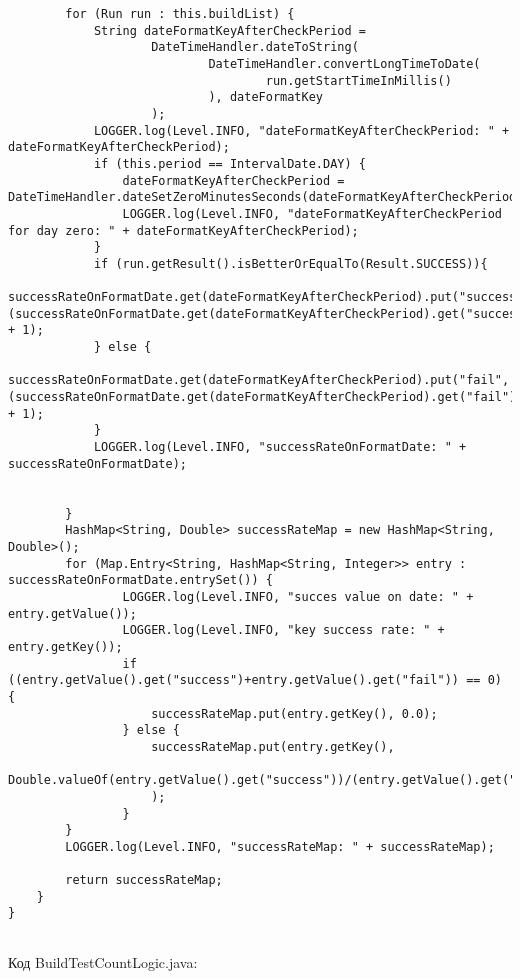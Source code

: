 \begin{lstlisting}
        for (Run run : this.buildList) {
            String dateFormatKeyAfterCheckPeriod =
                    DateTimeHandler.dateToString(
                            DateTimeHandler.convertLongTimeToDate(
                                    run.getStartTimeInMillis()
                            ), dateFormatKey
                    );
            LOGGER.log(Level.INFO, "dateFormatKeyAfterCheckPeriod: " + dateFormatKeyAfterCheckPeriod);
            if (this.period == IntervalDate.DAY) {
                dateFormatKeyAfterCheckPeriod = DateTimeHandler.dateSetZeroMinutesSeconds(dateFormatKeyAfterCheckPeriod);
                LOGGER.log(Level.INFO, "dateFormatKeyAfterCheckPeriod for day zero: " + dateFormatKeyAfterCheckPeriod);
            }
            if (run.getResult().isBetterOrEqualTo(Result.SUCCESS)){
                successRateOnFormatDate.get(dateFormatKeyAfterCheckPeriod).put("success", (successRateOnFormatDate.get(dateFormatKeyAfterCheckPeriod).get("success")) + 1);
            } else {
                successRateOnFormatDate.get(dateFormatKeyAfterCheckPeriod).put("fail", (successRateOnFormatDate.get(dateFormatKeyAfterCheckPeriod).get("fail")) + 1);
            }
            LOGGER.log(Level.INFO, "successRateOnFormatDate: " + successRateOnFormatDate);


        }
        HashMap<String, Double> successRateMap = new HashMap<String, Double>();
        for (Map.Entry<String, HashMap<String, Integer>> entry : successRateOnFormatDate.entrySet()) {
                LOGGER.log(Level.INFO, "succes value on date: " + entry.getValue());
                LOGGER.log(Level.INFO, "key success rate: " + entry.getKey());
                if ((entry.getValue().get("success")+entry.getValue().get("fail")) == 0) {
                    successRateMap.put(entry.getKey(), 0.0);
                } else {
                    successRateMap.put(entry.getKey(),
                            Double.valueOf(entry.getValue().get("success"))/(entry.getValue().get("success")+entry.getValue().get("fail"))
                    );
                }
        }
        LOGGER.log(Level.INFO, "successRateMap: " + successRateMap);

        return successRateMap;
    }
}


\end{lstlisting}

Код BuildTestCountLogic.java:

